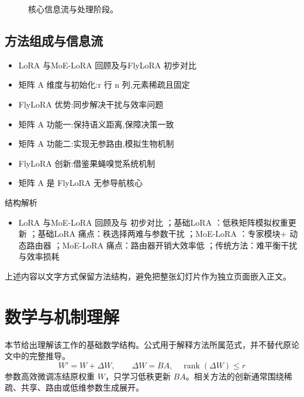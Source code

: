 \documentclass[UTF8,11pt,a4paper]{ctexart}
\begin{document}
\begin{figure}[H]
\centering
{}
\caption{核心信息流与处理阶段。}
\end{figure}

\subsection{方法组成与信息流}
\begin{itemize}
\item LoRA 与MoE-LoRA 回顾及与FlyLoRA 初步对比
\item 矩阵 A 维度与初始化:r 行 n 列,元素稀疏且固定
\item FlyLoRA 优势:同步解决干扰与效率问题
\item 矩阵 A 功能一:保持语义距离,保障决策一致
\item 矩阵 A 功能二:实现无参路由,模拟生物机制
\item FlyLoRA 创新:借鉴果蝇嗅觉系统机制
\item 矩阵 A 是 FlyLoRA 无参导航核心
\end{itemize}

\begin{keybox}{结构解析}
\begin{itemize}
\item LoRA 与MoE-LoRA 回顾及与 初步对比 ；基础LoRA ：低秩矩阵模拟权重更新 ；基础LoRA 痛点：秩选择两难与参数干扰 ；MoE-LoRA ：专家模块+ 动态路由器 ；MoE-LoRA 痛点：路由器开销大效率低 ；传统方法：难平衡干扰与效率损耗
\end{itemize}
\end{keybox}

上述内容以文字方式保留方法结构，避免把整张幻灯片作为独立页面嵌入正文。

\section{数学与机制理解}
本节给出理解该工作的基础数学结构。公式用于解释方法所属范式，并不替代原论文中的完整推导。
\begin{equation}
W'=W+\Delta W,\qquad \Delta W=BA,\quad \operatorname{rank}(\Delta W)\le r
\end{equation}
参数高效微调冻结原权重 $W$，只学习低秩更新 $BA$。相关方法的创新通常围绕稀疏、共享、路由或低维参数生成展开。
\end{document}
